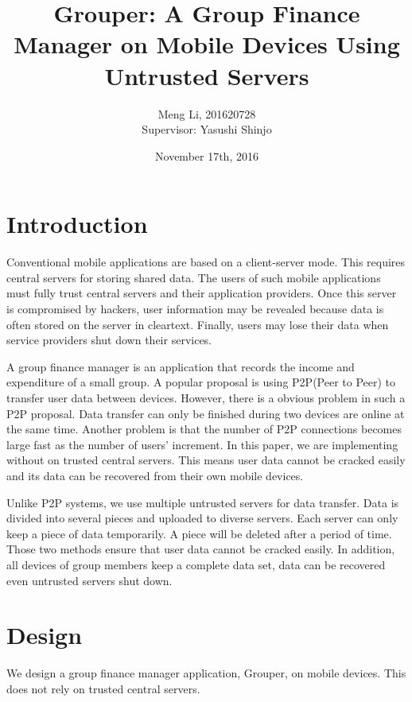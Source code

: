 \documentclass[twocolumn,10pt]{article}
\begin{document}
\date{November 17th, 2016}

\title{\bf Grouper: A Group Finance Manager on Mobile Devices Using Untrusted Servers}

\author{
	Meng Li, 201620728  
	\\ Supervisor: Yasushi Shinjo
}

\maketitle

\section{Introduction}
Conventional mobile applications are based on a client-server mode. This requires central servers for storing shared data. The users of such mobile applications must fully trust central servers and their application providers. Once this server is compromised by hackers, user information may be revealed because data is often stored on the server in cleartext. Finally, users may lose their data when service providers shut down their services. 

A group finance manager is an application that records the income and expenditure of a small group. A popular proposal is using P2P(Peer to Peer) to transfer user data between devices. However, there is a obvious problem in such a P2P proposal. Data transfer can only be finished during two devices are online at the same time. Another problem is that the number of P2P connections becomes large  fast as the number of users' increment.  In this paper, we are implementing without on trusted central servers. This means user data cannot be cracked easily and its data can be recovered from their own mobile devices. 

Unlike P2P systems, we use multiple untrusted servers for data transfer. Data is divided into several pieces and uploaded to diverse servers. Each server can only keep a piece of data temporarily. A piece will be deleted after a period of time. Those two methods ensure that user data cannot be cracked easily. In addition, all devices of group members keep a complete data set, data can be recovered even untrusted servers shut down.

\section{Design}

We design a group finance manager application, Grouper, on mobile devices. This does not rely on trusted central servers. 
\end{document}
